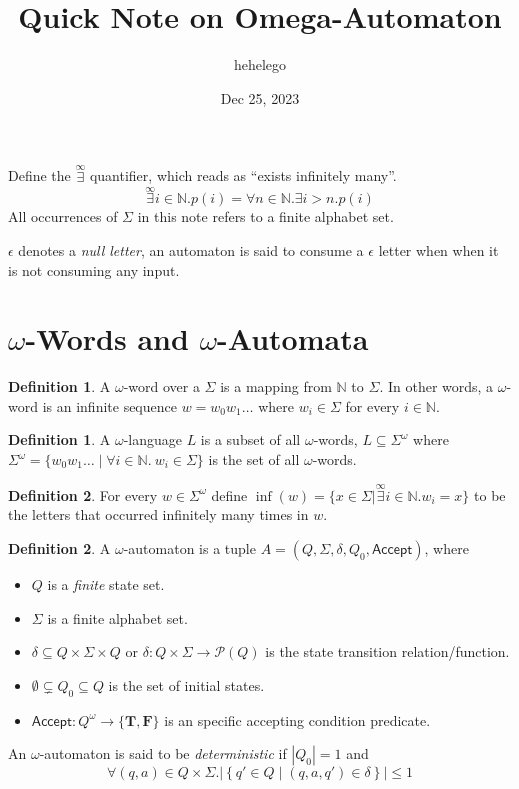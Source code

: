 \documentclass{article}
\title{Quick Note on Omega-Automaton}
\author{hehelego}
\date{Dec 25, 2023}
\theoremstyle{definition}
\newtheorem{definition}{Definition}
\newtheorem{subdef}{Definition}[definition]
\begin{document}
\maketitle

\newcommand{\exinf}{\stackrel{\infty}{\exists}}
\newcommand{\NN}{\mathbb{N}}
\newcommand{\TT}{\mathbf{T}}
\newcommand{\FF}{\mathbf{F}}
\newcommand{\BOOL}{\{\TT,\FF\}}

Define the \(\exinf\) quantifier, which reads as ``exists infinitely many''.
\[
	\exinf i\in\NN. p(i) = \forall n\in\NN . \exists i > n . p(i)
\]
All occurrences of \(\Sigma\) in this note refers to a finite alphabet set.

\(\epsilon\) denotes a \emph{null letter}, an automaton is said to consume a \(\epsilon\) letter when when it is not consuming any input.

\section{\(\omega\)-Words and \(\omega\)-Automata}

\begin{definition}
	A \(\omega\)-word over a \(\Sigma\) is a mapping from \(\NN\) to \(\Sigma\). In other words, a \(\omega\)-word is an infinite sequence \(w=w_0w_1\ldots\) where \(w_i\in\Sigma\) for every \(i\in\NN\).
\end{definition}
\begin{subdef}
	A \(\omega\)-language \(L\) is a subset of all \(\omega\)-words, \(L\subseteq\Sigma^\omega\) where \(\Sigma^\omega=\{w_0w_1\ldots \mid \forall i\in\NN .\ w_i\in\Sigma\}\) is the set of all \(\omega\)-words.
\end{subdef}
\begin{subdef}
	For every \(w\in\Sigma^\omega\) define \(\inf(w) = \{x\in\Sigma | \exinf i\in\NN . w_i=x \}\) to be the letters that occurred infinitely many times in \(w\).
\end{subdef}

\begin{definition}
	A \(\omega\)-automaton is a tuple \(A=(Q,\Sigma,\delta,Q_0,\mathsf{Accept})\), where
	\begin{itemize}
		\item \(Q\) is a \emph{finite} state set.
		\item \(\Sigma\) is a finite alphabet set.
		\item \(\delta \subseteq Q\times\Sigma\times Q\) or \(\delta: Q\times \Sigma\to \mathcal{P}(Q)\) is the state transition relation/function.
		\item \(\emptyset \subsetneq Q_0\subseteq Q\) is the set of initial states.
		\item \(\mathsf{Accept}:Q^\omega\to\BOOL\) is an specific accepting condition predicate.
	\end{itemize}
	An \(\omega\)-automaton is said to be \emph{deterministic} if \(|Q_0|=1\) and
	\[
		\forall (q,a)\in Q\times \Sigma .
		\left|\left\{q'\in Q\mid (q,a,q')\in \delta\right\}\right|\leq 1
	\]
\end{definition}
\end{document}
